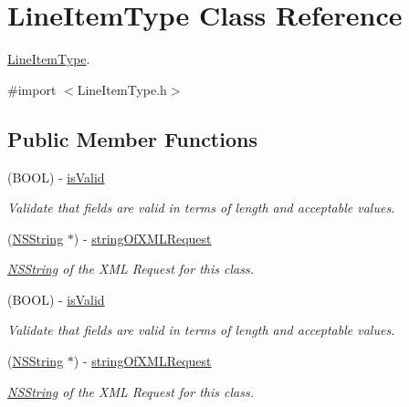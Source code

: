\hypertarget{interface_line_item_type}{
\section{LineItemType Class Reference}
\label{interface_line_item_type}
}


\hyperlink{interface_line_item_type}{LineItemType}.  




{\ttfamily \#import $<$LineItemType.h$>$}

\subsection*{Public Member Functions}
\begin{DoxyCompactItemize}
\item 
(BOOL) -\/ \hyperlink{interface_line_item_type_a469d81df14dc40459bca844b1c3a18f9}{isValid}
\begin{DoxyCompactList}\small\item\em Validate that fields are valid in terms of length and acceptable values. \item\end{DoxyCompactList}\item 
(\hyperlink{class_n_s_string}{NSString} $\ast$) -\/ \hyperlink{interface_line_item_type_ad0e1ea00f89a34714cfd95a60406142b}{stringOfXMLRequest}
\begin{DoxyCompactList}\small\item\em \hyperlink{class_n_s_string}{NSString} of the XML Request for this class. \item\end{DoxyCompactList}\item 
(BOOL) -\/ \hyperlink{interface_line_item_type_a469d81df14dc40459bca844b1c3a18f9}{isValid}
\begin{DoxyCompactList}\small\item\em Validate that fields are valid in terms of length and acceptable values. \item\end{DoxyCompactList}\item 
(\hyperlink{class_n_s_string}{NSString} $\ast$) -\/ \hyperlink{interface_line_item_type_ad0e1ea00f89a34714cfd95a60406142b}{stringOfXMLRequest}
\begin{DoxyCompactList}\small\item\em \hyperlink{class_n_s_string}{NSString} of the XML Request for this class. \item\end{DoxyCompactList}\item 

\end{DoxyCompactItemize}
